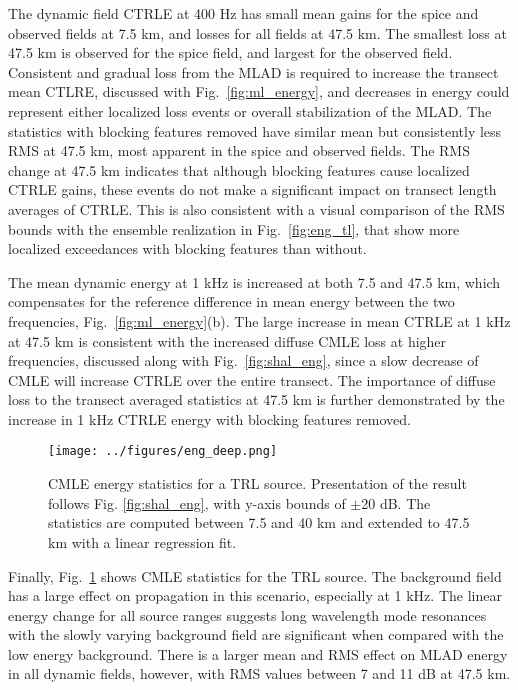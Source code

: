 \documentclass[preprint,NumberedRefs]{JASA}
\begin{document}
The dynamic field CTRLE at 400 Hz has small mean gains for the spice and observed fields at 7.5 km, and losses for all fields at 47.5 km. The smallest loss at 47.5 km is observed for the spice field, and largest for the observed field. Consistent and gradual loss from the MLAD is required to increase the transect mean CTLRE, discussed with Fig.~\ref{fig:ml_energy}, and decreases in energy could represent either localized loss events or overall stabilization of the MLAD. The statistics with blocking features removed have similar mean but consistently less RMS at 47.5 km, most apparent in the spice and observed fields. The RMS change at 47.5 km indicates that although blocking features cause localized CTRLE gains, these events do not make a significant impact on transect length averages of CTRLE. This is also consistent with a visual comparison of the RMS bounds with the ensemble realization in Fig.~\ref{fig:eng_tl}, that show more localized exceedances with blocking features than without.

The mean dynamic energy at 1 kHz is increased at both 7.5 and 47.5 km, which compensates for the reference difference in mean energy between the two frequencies, Fig.~\ref{fig:ml_energy}(b). The large increase in mean CTRLE at 1 kHz at 47.5 km is consistent with the increased diffuse CMLE loss at higher frequencies, discussed along with Fig.~\ref{fig:shal_eng}, since a slow decrease of CMLE will increase CTRLE over the entire transect. The importance of diffuse loss to the transect averaged statistics at 47.5 km is further demonstrated by the increase in 1 kHz CTRLE energy with blocking features removed.

\begin{figure}
\texttt{[image: ../figures/eng\_deep.png]}
    \caption{CMLE energy statistics for a TRL source. Presentation of the result follows Fig. \ref{fig:shal_eng}, with y-axis bounds of $\pm$20 dB. The statistics are computed between 7.5 and 40 km and extended to 47.5 km with a linear regression fit.}
    \label{fig:deep_eng}
\end{figure}
Finally, Fig.~\ref{fig:deep_eng} shows CMLE statistics for the TRL source. The background field has a large effect on propagation in this scenario, especially at 1 kHz. The linear energy change for all source ranges suggests long wavelength mode resonances with the slowly varying background field\cite{colosi21} are significant when compared with the low energy background. There is a larger mean and RMS effect on MLAD energy in all dynamic fields, however, with RMS values between 7 and 11 dB at 47.5 km.
\end{document}
